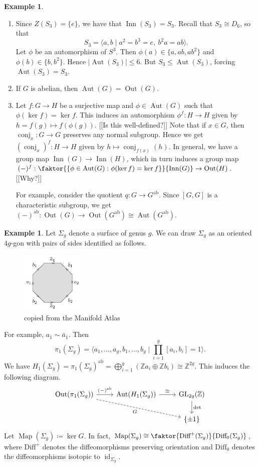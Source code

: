 \documentclass[10pt,letterpaper,cm]{nupset}
\theoremstyle{definition}
\newtheorem{exmp}[definition]{Example}
\theoremstyle{theorem}
\theoremstyle{remark}
\newcommand{\Z}{\mathbb Z}
\newcommand{\1}{\mathbf{1}}
\newcommand{\0}{\vec 0}
\DeclareMathOperator*{\GL}{GL}
\DeclareMathOperator{\id}{id}
\DeclareMathOperator{\aut}{Aut}
\DeclareMathOperator{\inn}{Inn}
\DeclareMathOperator{\out}{Out}
\DeclareMathOperator{\ab}{ab}
\DeclareMathOperator{\conj}{conj}
\DeclareMathOperator{\map}{Map}
\begin{document}
\begin{exmp} $ $
\begin{enumerate}
\item Since $Z(S_3) =\{e\}$, we have that $\inn(S_3) = S_3$. Recall that $S_3 \cong D_6$, so that $$S_3 = \langle a, b \mid a^2 = b^3 = e,\ b^2a = ab\rangle.$$ Let $\phi$ be an automorphism of $S^3$. Then $\phi(a) \in \{a, ab, ab^2\}$ and $\phi(b) \in \{b, b^2\}$. Hence $|\aut(S_3)|\leq 6$. But $S_3 \leq \aut(S_3)$, forcing $\aut(S_3) = S_3$.
\item If $G$ is abelian, then $\aut(G)= \out(G)$.
\item Let $f: G \to H$ be a surjective map and $\phi \in \aut(G)$ such that $\phi(\ker f) = \ker f$. This induces an automorphism $\phi^f : H \to H$ given by $h = f(g) \mapsto f(\phi(g))$. {[[Is this well-defined?]]} Note that if $x\in G$, then $\conj_x: G \to G$ preserves any normal subgroup. Hence we get $(\conj_x)^f : H \to H$ given by $h\mapsto \conj_{f(x)}(h)$. In general, we have a group map $\inn(G) \to \inn(H)$, which in turn induces a group map $(-)^f: \faktor{\{\phi \in \aut(G) : \phi(\ker f)= \ker f\}}{\inn(G)} \to \out(H)$. {[[Why?]]}

For example, consider the quotient $q : G \to G^{\ab}$. Since $[G, G]$ is a characteristic subgroup, we get $(-)^{\ab} : \out(G) \to \out(G^{\ab})\cong \aut(G^{\ab})$.
\end{enumerate}
\end{exmp}

\begin{exmp}
Let $\Sigma_g$ denote a surface of genus $g$.
We can draw $\Sigma_g$ as an oriented  $4g$-gon with pairs of sides identified as follows.
\begin{figure}[H]
\centering
\includegraphics[width=30mm]{polygon-Sg.png}
\caption{copied from the Manifold Atlas} \label{overflow}
\end{figure} 
For example, $a_1 \sim \bar{a}_1$.  Then $$\pi_1(\Sigma_g) = \langle a_1, \ldots, a_g, b_1, \ldots, b_g \mid \prod_{i=1}^g [a_i, b_i] = 1 \rangle.$$ We have $H_1(\Sigma_g) = \pi_1(\Sigma_g)^{\ab} = \bigoplus_{i=1}^g (\Z a_i \oplus \Z b_i)\cong \Z^{2g}.$ This induces the following diagram.
\[
\begin{tikzcd}
\out(\pi_1(\Sigma_g)) \arrow[r, "(-)^{\ab}"] \arrow[rrd, "G"', dashed] & \aut(H_1(\Sigma_g)) \arrow[r, "\cong"] & \GL_{2g}(\Z) \arrow[d, "\det"] \\
 &  & \{\pm 1\}
\end{tikzcd}
\]
Let $\map(\Sigma_g) \coloneqq  \ker G$. In fact, $\map(\Sigma_g) \cong \faktor{\text{Diff}^+(\Sigma_g)}{\text{Diff}_0(\Sigma_g)}$, where $\text{Diff}^+$ denotes the diffeomorphisms preserving orientation and $\text{Diff}_0$ denotes the diffeomorphisms isotopic to $\id_{\Sigma_g}$.
\end{exmp}
\end{document}
